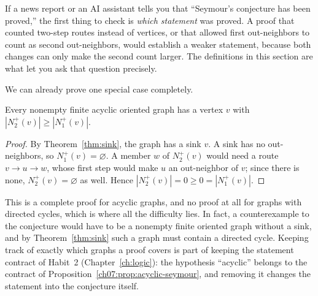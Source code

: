 If a news report or an AI assistant tells you that ``Seymour's conjecture has been proved,'' the first thing to check is \emph{which statement} was proved. A proof that counted two-step routes instead of vertices, or that allowed first out-neighbors to count as second out-neighbors, would establish a weaker statement, because both changes can only make the second count larger. The definitions in this section are what let you ask that question precisely.

We can already prove one special case completely.

\par\noindent\begin{minipage}{\linewidth}
\begin{proposition}\label{ch07:prop:acyclic-seymour}
Every nonempty finite acyclic oriented graph has a vertex $v$ with $|N_2^+(v)|\ge|N_1^+(v)|$.
\end{proposition}
\end{minipage}\par

\begin{proof}
By Theorem~\ref{thm:sink}, the graph has a sink $v$. A sink has no out-neighbors, so $N_1^+(v)=\varnothing$. A member $w$ of $N_2^+(v)$ would need a route $v\to u\to w$, whose first step would make $u$ an out-neighbor of $v$; since there is none, $N_2^+(v)=\varnothing$ as well. Hence $|N_2^+(v)|=0\ge0=|N_1^+(v)|$.
\end{proof}

This is a complete proof for acyclic graphs, and no proof at all for graphs with directed cycles, which is where all the difficulty lies. In fact, a counterexample to the conjecture would have to be a nonempty finite oriented graph without a sink, and by Theorem~\ref{thm:sink} such a graph must contain a directed cycle. Keeping track of exactly which graphs a proof covers is part of keeping the statement contract of Habit~2 (Chapter~\ref{ch:logic}): the hypothesis ``acyclic'' belongs to the contract of Proposition~\ref{ch07:prop:acyclic-seymour}, and removing it changes the statement into the conjecture itself.
